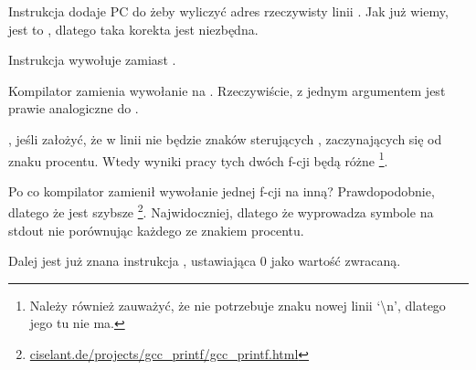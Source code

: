 Instrukcja  dodaje \ac{PC} do  żeby wyliczyć adres rzeczywisty linii . Jak już wiemy, jest to \q{\PICcode}, dlatego taka korekta jest niezbędna.

Instrukcja  wywołuje \puts zamiast \printf.

\label{puts}
Kompilator zamienia wywołanie \printf na \puts. 
Rzeczywiście, \printf z jednym argumentem jest prawie analogiczne do \puts.
 
, jeśli założyć, że w linii nie będzie znaków sterujących \printf, 
zaczynających się od znaku procentu. Wtedy wyniki pracy tych dwóch f-cji będą różne
\footnote{Należy również zauważyć, że \puts nie potrzebuje znaku nowej linii `\textbackslash{}n',
dlatego jego tu nie ma.}.

Po co kompilator zamienił wywołanie jednej f-cji na inną? Prawdopodobnie, dlatego że \puts jest szybsze
\footnote{\href{http://go.yurichev.com/17063}{ciselant.de/projects/gcc\_printf/gcc\_printf.html}}. 
Najwidoczniej, dlatego że \puts wyprowadza symbole na \gls{stdout} nie porównując każdego ze znakiem procentu.

Dalej jest już znana instrukcja , ustawiająca 0 jako wartość zwracaną.


